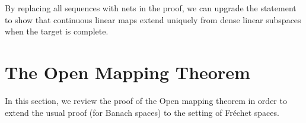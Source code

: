 \documentclass[notes.tex]{subfiles}
\begin{document}
\begin{remark}
	By replacing all sequences with nets in the proof, we can upgrade the statement to show that continuous linear maps extend uniquely from dense linear subspaces when the target is complete.
\end{remark}

\section{The Open Mapping Theorem}
In this section, we review the proof of the Open mapping theorem in order to extend the usual proof (for Banach spaces) to the setting of Fr\'echet spaces.
\end{document}
